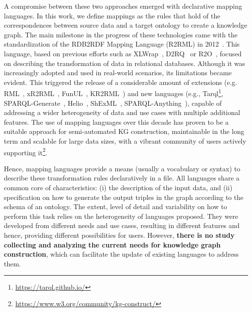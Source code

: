 A compromise between these two approaches emerged with declarative mapping languages. In this work, we define mappings as the rules that hold of the correspondences between source data and a target ontology to create a knowledge graph. The main milestone in the progress of these technologies came with the standardization of the RDB2RDF Mapping Language (R2RML) in 2012~\citep{das2012r2rml}. This language, based on previous efforts such as XLWrap~\citep{xlwrap}, D2RQ~\citep{bizer2004d2rq} or R2O~\citep{barrasa2004r2o}, focused on describing the transformation of data in relational databases. Although it was increasingly adopted and used in real-world scenarios, its limitations became evident. This triggered the release of a considerable amount of extensions (e.g. RML~\citep{Dimou2014rml}, xR2RML~\citep{michel2015xr2rml}, FunUL~\citep{junior2016funul}, KR2RML~\citep{slepicka2015kr2rml}) and new languages (e.g., Tarql\footnote{\url{https://tarql.github.io/}}, SPARQL-Generate~\citep{Lefrancois2017sparqlgenerate}, Helio~\citep{cimmino2022helio}, ShExML~\citep{Garcia-Gonzalez2020shexml}, SPARQL-Anything~\citep{asprino2023sparql-anything}), capable of addressing a wider heterogeneity of data and use cases with multiple additional features. The use of mapping languages over this decade has proven to be a suitable approach for semi-automated KG construction, maintainable in the long term and scalable for large data sizes, with a vibrant community of users actively supporting it\footnote{\url{https://www.w3.org/community/kg-construct/}}. 


 Hence, mapping languages provide a means (usually a vocabulary or syntax) to describe these transformation rules declaratively in a file. All languages share a common core of characteristics: (i) the description of the input data, and (ii) specification on how to generate the output triples in the graph according to the schema of an ontology. The extent, level of detail and variability on how to perform this task relies on the heterogeneity of languages proposed. They were developed from different needs and use cases, resulting in different features and hence, providing different possibilities for users. However, \textbf{there is no study collecting and analyzing the current needs for knowledge graph construction}, which can facilitate the update of existing languages to address them. 


